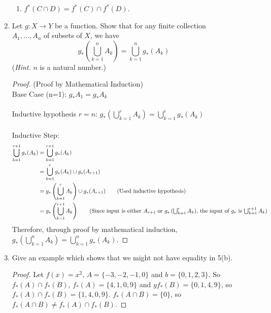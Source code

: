 \documentclass[11pt]{letter}
\theoremstyle{definition}
\begin{document}
\begin{description}
\begin{enumerate}
\begin{enumerate}
                                  
					\item $f^*(C\cap D)=f^*(C)\cap f^*(D)$.
				\end{enumerate}
			\item Let $g:X\rightarrow Y$ be a function. Show that for any finite collection $A_1,\ldots,A_n$ of subsets of $X$, we have
				\begin{equation*}
					g_*\left(\bigcup_{k=1}^nA_k\right)=\bigcup_{k=1}^ng_*(A_k)
				\end{equation*}
				({\em Hint.} $n$ is a natural number.)
			        \begin{proof}(Proof by Mathematical Induction)\\ 
                                  Base Case (n=1): $g_*A_1=g_*A_k$\\ \\
                                  Inductive hypothesis $r=n$: $g_*\left(\bigcup_{k=1}^rA_k\right)=\bigcup_{k=1}^rg_*(A_k)$\\ \\
                                  Inductive Step:
                                  \begin{align*}
                                    \bigcup_{k=1}^{r+1}g_*(A_k)&=\bigcup_{k=1}^{r+1}g_*(A_k) \\
                                    &= \bigcup_{k=1}^rg_*(A_k)\cup g_*(A_{r+1})\\
                                    &=  g_*\left(\bigcup_{k=1}^rA_k\right)\cup g_*(A_{r+1})\tag{Used inductive hypothesis}\\
                                    &=g_*\left(\bigcup_{k=1}^{r+1}A_k\right) \tag{Since input is either $A_{r+1}$ or $g_*\left(\bigcup_{k=1}^rA_k\right)$, the input of $g_*$ is $\bigcup_{k=1}^{r+1}A_k$}\\                                    
                                  \end{align*}
                                  Therefore, through proof by mathematical induction, $g_*\left(\bigcup_{k=1}^nA_k\right)=\bigcup_{k=1}^ng_*(A_k)$.
                                  
                                \end{proof}
                                
			      \item Give an example which shows that we might not have equality in 5(b).
                                \begin{proof}
                                  Let $f(x)=x^2$, $A=\{-3,-2,-1,0\}$ and $b=\{0,1,2,3\}$. So $f_*(A)\cap f_*(B)$, $f_*(A)=\{4,1,0,9\}$ and $yf_*(B)=\{0,1,4,9\}$, so $f_*(A)\cap f_*(B)=\{1,4,0,9\}$. $f_*(A\cap B)=\{0\}$, so $f_*(A\cap B)\neq f_*(A)\cap f_*(B)$.
                                \end{proof}
                                

\end{enumerate}
\end{description}
\end{document}
